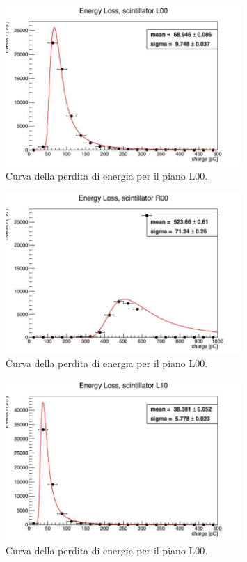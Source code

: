 \begin{figure}[H]
  \centering
  \includegraphics[width=0.8\textwidth]{plots/energy_L00.jpg}
  \caption{Curva della perdita di energia per il piano L00.}
  \label{fig:l00}
\end{figure}

\begin{figure}[H]
  \centering
  \includegraphics[width=0.8\textwidth]{plots/energy_R00.jpg}
  \caption{Curva della perdita di energia per il piano L00.}
  \label{fig:r00}
\end{figure}

\begin{figure}[H]
  \centering
  \includegraphics[width=0.8\textwidth]{plots/energy_L10.jpg}
  \caption{Curva della perdita di energia per il piano L00.}
  \label{fig:l10}
\end{figure}

